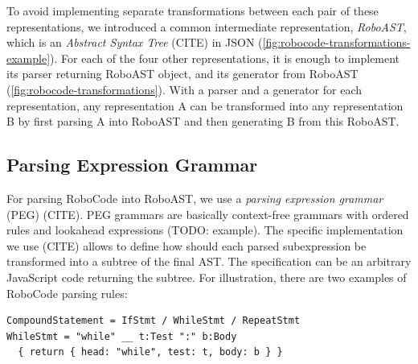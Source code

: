 To avoid implementing separate transformations between each pair of these
representations, we introduced a common intermediate representation,
\emph{RoboAST}, which is an %
\emph{Abstract Syntax Tree} (CITE) in JSON
(\cref{fig:robocode-transformations-example}).
For each of the four other representations, it is enough to implement
its parser returning RoboAST object, and
its generator from RoboAST (\cref{fig:robocode-transformations}).
With a parser and a generator for each representation,
any representation A can be transformed into any representation B
by first parsing A into RoboAST and then generating B from this RoboAST.




\subsection{Parsing Expression Grammar}

For parsing RoboCode into RoboAST, we use a \emph{parsing expression grammar}
(PEG) (CITE).
PEG grammars are basically context-free grammars with ordered rules
and lookahead expressions (TODO: example).  %
The specific implementation we use (CITE) allows to define how should each
parsed subexpression be transformed into a subtree of the final AST.
The specification can be an arbitrary JavaScript code returning the subtree.
For illustration, there are
two %
examples of RoboCode parsing rules:

\begin{lstlisting}
CompoundStatement = IfStmt / WhileStmt / RepeatStmt
WhileStmt = "while" __ t:Test ":" b:Body
  { return { head: "while", test: t, body: b } }
\end{lstlisting}

